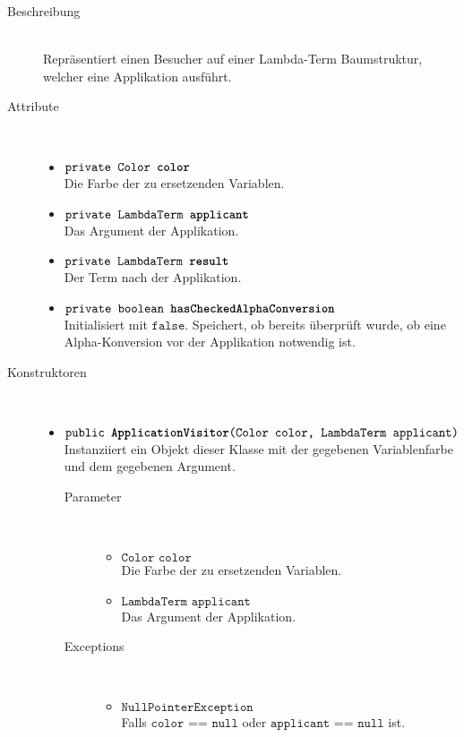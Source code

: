 \begin{description}
\item[Beschreibung] \hfill \\ Repräsentiert einen Besucher auf einer Lambda-Term Baumstruktur, welcher eine Applikation ausführt.

\item[Attribute] \hfill \\
	\vspace{-.8cm}
	\begin{itemize}
		\item $\texttt{private Color \textbf{color}}$ \\ Die Farbe der zu ersetzenden Variablen.
		\item $\texttt{private LambdaTerm \textbf{applicant}}$ \\ Das Argument der Applikation.
		\item $\texttt{private LambdaTerm \textbf{result}}$ \\ Der Term nach der Applikation.
		\item $\texttt{private boolean \textbf{hasCheckedAlphaConversion}}$ \\ Initialisiert mit $\texttt{false}$. Speichert, ob bereits überprüft wurde, ob eine Alpha-Konversion vor der Applikation notwendig ist.
	\end{itemize}

\item[Konstruktoren] \hfill \\
	\vspace{-.8cm}
	\begin{itemize}
		\item $\texttt{public \textbf{ApplicationVisitor}(Color color, LambdaTerm applicant)}$ \\ Instanziiert ein Objekt dieser Klasse mit der gegebenen Variablenfarbe und dem gegebenen Argument.
		\begin{description}
			\item[Parameter] \hfill \\
			\vspace{-.8cm}
			\begin{itemize}
				\item $\texttt{Color color}$ \\ Die Farbe der zu ersetzenden Variablen.
				\item $\texttt{LambdaTerm applicant}$ \\ Das Argument der Applikation.
			\end{itemize}
			\item[Exceptions] \hfill \\
			\vspace{-.8cm}
			\begin{itemize}
				\item $\texttt{NullPointerException}$ \\ Falls $\texttt{color == null}$ oder $\texttt{applicant == null}$ ist.
			\end{itemize}
		\end{description}
	\end{itemize}


\end{description}
